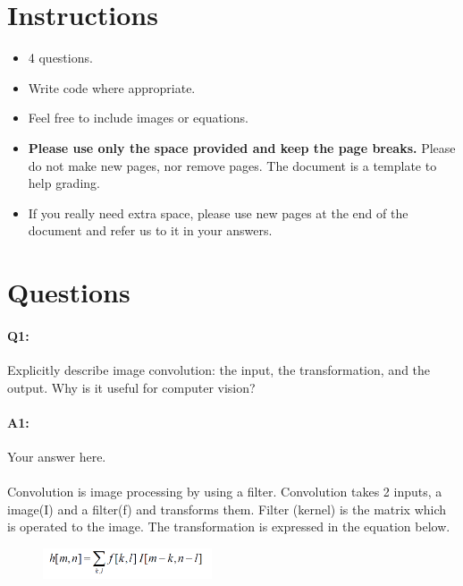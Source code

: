 	\maketitle
	\vspace{-3cm}
	\thispagestyle{fancy}
	
	\section*{Instructions}
	\begin{itemize}
		\item 4 questions.
		\item Write code where appropriate.
		\item Feel free to include images or equations.
		\item \textbf{Please use only the space provided and keep the page breaks.} Please do not make new pages, nor remove pages. The document is a template to help grading.
		\item If you really need extra space, please use new pages at the end of the document and refer us to it in your answers.
	\end{itemize}

	\section*{Questions}
	
	\paragraph{Q1:} Explicitly describe image convolution: the input, the transformation, and the output. Why is it useful for computer vision?
	
	\paragraph{A1:} Your answer here.
	\\ \\
	Convolution is image processing by using a filter. Convolution takes 2 inputs, a image(I) and a filter(f) and transforms them. Filter (kernel) is the matrix which is operated to the image. The transformation is expressed in the equation below.\\

	\begin{figure}[h]
    \centering
    \includegraphics[width=5cm]{questions/convolution.PNG}
    \label{fig:equation1}
    \end{figure}
    
